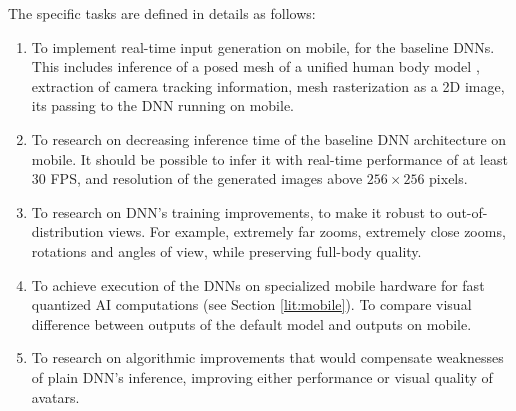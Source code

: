 The specific tasks are defined in details as follows:
\begin{enumerate}
	\item To implement real-time input generation on mobile, for the baseline DNNs. This includes inference of a posed mesh of a unified human body model \cite{dnn:smplx19}, extraction of camera tracking information, mesh rasterization as a 2D image, its passing to the DNN running on mobile.
	\item To research on decreasing inference time of the baseline \cite{dnn:stylepeople21} DNN architecture on mobile. It should be possible to infer it with real-time performance of at least 30 FPS, and resolution of the generated images above $256\times256$ pixels.
	\item To research on DNN's training improvements, to make it robust to out-of-distribution views. For example, extremely far zooms, extremely close zooms, rotations and angles of view, while preserving full-body quality.
	\item To achieve execution of the DNNs on specialized mobile hardware for fast quantized AI computations (see Section \ref{lit:mobile}). To compare visual difference between outputs of the default model and outputs on mobile.
	\item To research on algorithmic improvements that would compensate weaknesses of plain DNN's inference, improving either performance or visual quality of avatars.

\end{enumerate}

\newpage




